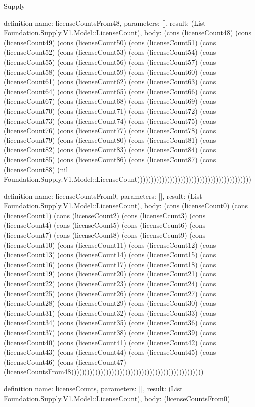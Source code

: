 \begin{lexlean}{Supply}
\begin{semanticmodule}
definition{
  name: licenseCountsFrom48,
  parameters: [],
  result: (List Foundation.Supply.V1.Model::LicenseCount),
  body: (cons (licenseCount48) (cons (licenseCount49) (cons (licenseCount50) (cons (licenseCount51) (cons (licenseCount52) (cons (licenseCount53) (cons (licenseCount54) (cons (licenseCount55) (cons (licenseCount56) (cons (licenseCount57) (cons (licenseCount58) (cons (licenseCount59) (cons (licenseCount60) (cons (licenseCount61) (cons (licenseCount62) (cons (licenseCount63) (cons (licenseCount64) (cons (licenseCount65) (cons (licenseCount66) (cons (licenseCount67) (cons (licenseCount68) (cons (licenseCount69) (cons (licenseCount70) (cons (licenseCount71) (cons (licenseCount72) (cons (licenseCount73) (cons (licenseCount74) (cons (licenseCount75) (cons (licenseCount76) (cons (licenseCount77) (cons (licenseCount78) (cons (licenseCount79) (cons (licenseCount80) (cons (licenseCount81) (cons (licenseCount82) (cons (licenseCount83) (cons (licenseCount84) (cons (licenseCount85) (cons (licenseCount86) (cons (licenseCount87) (cons (licenseCount88) (nil Foundation.Supply.V1.Model::LicenseCount))))))))))))))))))))))))))))))))))))))))))
}

definition{
  name: licenseCountsFrom0,
  parameters: [],
  result: (List Foundation.Supply.V1.Model::LicenseCount),
  body: (cons (licenseCount0) (cons (licenseCount1) (cons (licenseCount2) (cons (licenseCount3) (cons (licenseCount4) (cons (licenseCount5) (cons (licenseCount6) (cons (licenseCount7) (cons (licenseCount8) (cons (licenseCount9) (cons (licenseCount10) (cons (licenseCount11) (cons (licenseCount12) (cons (licenseCount13) (cons (licenseCount14) (cons (licenseCount15) (cons (licenseCount16) (cons (licenseCount17) (cons (licenseCount18) (cons (licenseCount19) (cons (licenseCount20) (cons (licenseCount21) (cons (licenseCount22) (cons (licenseCount23) (cons (licenseCount24) (cons (licenseCount25) (cons (licenseCount26) (cons (licenseCount27) (cons (licenseCount28) (cons (licenseCount29) (cons (licenseCount30) (cons (licenseCount31) (cons (licenseCount32) (cons (licenseCount33) (cons (licenseCount34) (cons (licenseCount35) (cons (licenseCount36) (cons (licenseCount37) (cons (licenseCount38) (cons (licenseCount39) (cons (licenseCount40) (cons (licenseCount41) (cons (licenseCount42) (cons (licenseCount43) (cons (licenseCount44) (cons (licenseCount45) (cons (licenseCount46) (cons (licenseCount47) (licenseCountsFrom48)))))))))))))))))))))))))))))))))))))))))))))))))
}

definition{
  name: licenseCounts,
  parameters: [],
  result: (List Foundation.Supply.V1.Model::LicenseCount),
  body: (licenseCountsFrom0)
}


\end{semanticmodule}
\end{lexlean}
